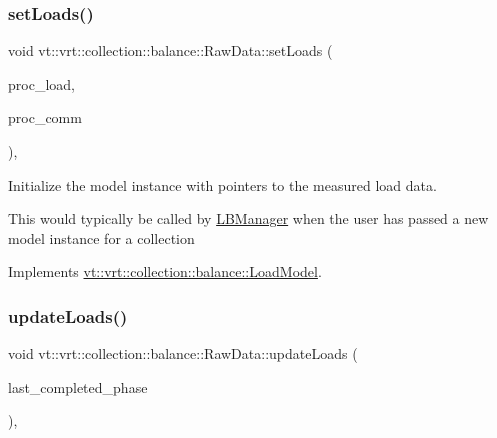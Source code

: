 \subsubsection{\texorpdfstring{set\+Loads()}{setLoads()}}
{\footnotesize\ttfamily void vt\+::vrt\+::collection\+::balance\+::\+Raw\+Data\+::set\+Loads (\begin{DoxyParamCaption}\item[{std\+::unordered\+\_\+map$<$ \hyperlink{namespacevt_a46ce6733d5cdbd735d561b7b4029f6d7}{Phase\+Type}, \hyperlink{namespacevt_1_1vrt_1_1collection_1_1balance_a5339303db2e1ce964d783a53fd74e6b1}{Load\+Map\+Type} $>$ const $\ast$}]{proc\+\_\+load,  }\item[{std\+::unordered\+\_\+map$<$ \hyperlink{namespacevt_a46ce6733d5cdbd735d561b7b4029f6d7}{Phase\+Type}, \hyperlink{namespacevt_1_1vrt_1_1collection_1_1balance_a01ee1fb0ae2da1d2ab7fdca3be9ae351}{Comm\+Map\+Type} $>$ const $\ast$}]{proc\+\_\+comm }\end{DoxyParamCaption})\hspace{0.3cm}{\ttfamily [override]}, {\ttfamily [virtual]}}



Initialize the model instance with pointers to the measured load data. 

This would typically be called by \hyperlink{structvt_1_1vrt_1_1collection_1_1balance_1_1_l_b_manager}{L\+B\+Manager} when the user has passed a new model instance for a collection 

Implements \hyperlink{structvt_1_1vrt_1_1collection_1_1balance_1_1_load_model_a07512b8d95025a21a7c25cc3fdb817ad}{vt\+::vrt\+::collection\+::balance\+::\+Load\+Model}.

\mbox{\label{structvt_1_1vrt_1_1collection_1_1balance_1_1_raw_data_a4aaae24a53ead0248b873911ce560a34}} 
\subsubsection{\texorpdfstring{update\+Loads()}{updateLoads()}}
{\footnotesize\ttfamily void vt\+::vrt\+::collection\+::balance\+::\+Raw\+Data\+::update\+Loads (\begin{DoxyParamCaption}\item[{\hyperlink{namespacevt_a46ce6733d5cdbd735d561b7b4029f6d7}{Phase\+Type}}]{last\+\_\+completed\+\_\+phase }\end{DoxyParamCaption})\hspace{0.3cm}{\ttfamily [override]}, {\ttfamily [virtual]}}



